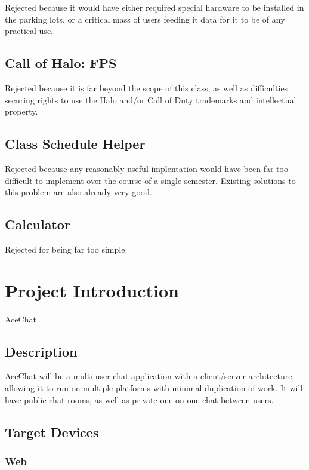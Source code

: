 \documentclass[11pt]{article}
\begin{document}
Rejected because it would have either required special hardware to be
installed in the parking lots, or a critical mass of users feeding it
data for it to be of any practical use.

\subsection{Call of Halo: FPS}
\label{sec-2-4}

Rejected because it is far beyond the scope of this class, as well as
difficulties securing rights to use the Halo and/or Call of Duty
trademarks and intellectual property.

\subsection{Class Schedule Helper}
\label{sec-2-5}

Rejected because any reasonably useful implentation would have been
far too difficult to implement over the course of a single
semester. Existing solutions to this problem are also already very good.

\subsection{Calculator}
\label{sec-2-6}

Rejected for being far too simple.

\section{Project Introduction}
\label{sec-3}

AceChat

\subsection{Description}
\label{sec-3-1}

AceChat will be a multi-user chat application with a client/server
architecture, allowing it to run on multiple platforms with minimal
duplication of work. It will have public chat rooms, as well as
private one-on-one chat between users.

\subsection{Target Devices}
\label{sec-3-2}

\subsubsection{Web}
\label{sec-3-2-1}
\end{document}

